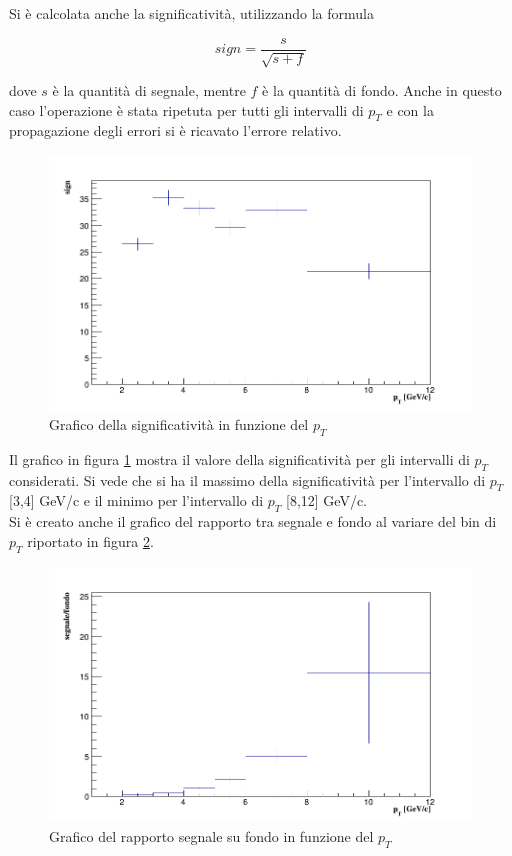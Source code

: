 Si è calcolata anche la significatività, utilizzando la formula 
 
 \begin{equation}
     sign = \frac{s}{\sqrt{s+f}}
 \end{equation}

dove $s$ è la quantità di segnale, mentre $f$ è la quantità di fondo. Anche in questo caso l'operazione è stata ripetuta per tutti gli intervalli di $p_T$ e con la propagazione degli errori si è ricavato l'errore relativo.

    \begin{figure}[htbp] 
        \centering
        \includegraphics[width=0.9\linewidth]{AnalisiDati/significance.png}
        \caption{Grafico della significatività in funzione del $p_T$}
        \label{fig:significatività}
    \end{figure}

Il grafico in figura \ref{fig:significatività} mostra il valore della significatività per gli intervalli di $p_T$ considerati. Si vede che si ha il massimo della significatività per l'intervallo di $p_T$ [3,4] GeV/c e il minimo per l'intervallo di $p_T$ [8,12] GeV/c.
\\Si è creato anche il grafico del rapporto tra segnale e fondo al variare del bin di $p_T$ riportato in figura \ref{fig:s_b}. 

    \begin{figure}[htbp] 
        \centering
        \includegraphics[width=0.9\linewidth]{AnalisiDati/s_b.png}
        \caption{Grafico del rapporto segnale su fondo in funzione del $p_T$}
        \label{fig:s_b}
    \end{figure}
    
